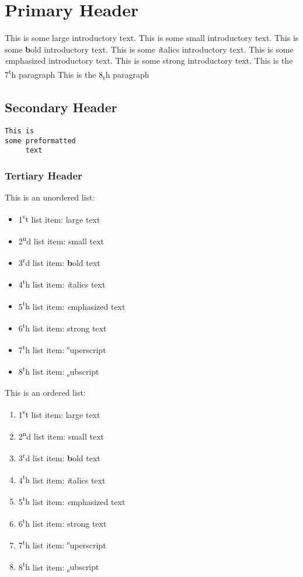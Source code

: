 \documentclass[12pt]{article}
\begin{document}
\section{Primary Header}This is some {\Large large introductory} text.
This is some {\scriptsize small introductory} text.
This is some {\textbf bold introductory} text.
This is some {\textit italics introductory} text.
This is some {\emph emphasized introductory} text.
This is some {\textmd strong introductory} text.
This is the 7{\textsuperscript th} paragraph
This is the 8{\textsubscript th} paragraph
\subsection{Secondary Header}\begin{verbatim}This is
some preformatted
     text\end{verbatim}
\subsubsection{Tertiary Header}This is an unordered list:
\begin{itemize}
    \item 1{\textsuperscript st} list item: {\Large large text}
    \item 2{\textsuperscript nd} list item: {\scriptsize small text}
    \item 3{\textsuperscript rd} list item: {\textbf bold text}
    \item 4{\textsuperscript th} list item: {\textit italics text}
    \item 5{\textsuperscript th} list item: {\emph emphasized text}
    \item 6{\textsuperscript th} list item: {\textmd strong text}
    \item 7{\textsuperscript th} list item: {\textsuperscript superscript}
    \item 8{\textsuperscript th} list item: {\textsubscript subscript}
\end{itemize}
This is an ordered list:
\begin{enumerate}
    \item 1{\textsuperscript st} list item: {\Large large text}
    \item 2{\textsuperscript nd} list item: {\scriptsize small text}
    \item 3{\textsuperscript rd} list item: {\textbf bold text}
    \item 4{\textsuperscript th} list item: {\textit italics text}
    \item 5{\textsuperscript th} list item: {\emph emphasized text}
    \item 6{\textsuperscript th} list item: {\textmd strong text}
    \item 7{\textsuperscript th} list item: {\textsuperscript superscript}
    \item 8{\textsuperscript th} list item: {\textsubscript subscript}
\end{enumerate}
\end{document}
